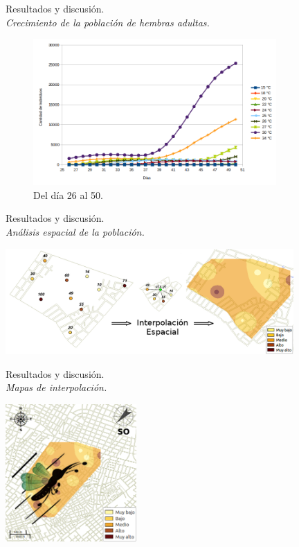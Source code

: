 \begin{frame}[t]{Resultados y discusión.\\\textit{Crecimiento de la población de hembras adultas.}}
\begin{figure}
    \includegraphics[width=9.3cm]{./graphics/poblacion-adulto-p2.png}
    \caption{Del día 26 al 50.}
\end{figure}
\end{frame}

\begin{frame}[t]{Resultados y discusión.\\\textit{Análisis espacial de la población.}}
\begin{center}
    \includegraphics[width=11cm]{./graphics/identificacion-focos.png}
\end{center}
\end{frame}

\begin{frame}[t]{Resultados y discusión.\\\textit{Mapas de interpolación.}}
\begin{center}
    \includegraphics[width=5cm]{./graphics/raster-dispersion.png}
\end{center}
\end{frame}

